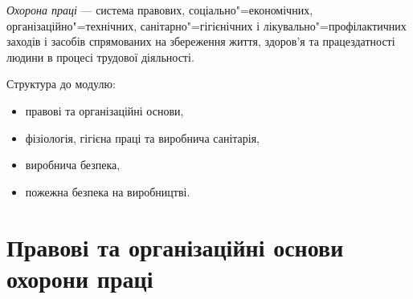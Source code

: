 \documentclass[a5paper,10pt,notitlepage,pdftex,headsepline]{scrartcl}
\begin{document}
  \emph{Охорона праці} --- система правових, соціально"=економічних,
  організаційно"=технічних, санітарно"=гігієнічних і лікувально"=профілактичних
  заходів і засобів спрямованих на збереження життя, здоров’я та
  працездатності людини в процесі трудової діяльності.

  Структура до модулю:
  \begin{itemize}
    \item правові та організаційні основи,
    \item фізіологія, гігієна праці та виробнича санітарія,
    \item виробнича безпека,
    \item пожежна безпека на виробництві.
  \end{itemize}
\section{Правові та організаційні основи охорони праці}
\end{document}
